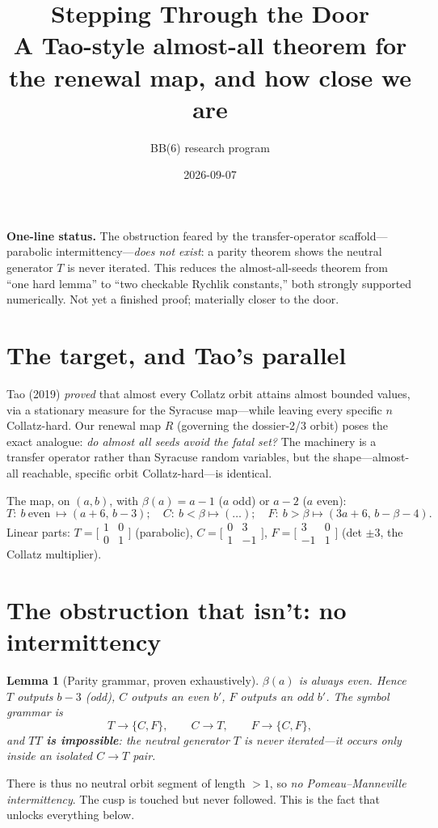 \documentclass[11pt]{article}
\title{\bfseries\color{ink} Stepping Through the Door\\[2pt]\large A Tao-style almost-all theorem for the renewal map, and how close we are}
\author{BB(6) research program}\date{2026-09-07}
\newtheorem{lemma}{Lemma}\newtheorem{theorem}{Theorem}
\begin{document}
\maketitle

\noindent\textbf{One-line status.} The obstruction feared by the transfer-operator scaffold---parabolic intermittency---\emph{does not exist}: a parity theorem shows the neutral generator $T$ is never iterated. This reduces the almost-all-seeds theorem from ``one hard lemma'' to ``two checkable Rychlik constants,'' both strongly supported numerically. Not yet a finished proof; materially closer to the door.

\section{The target, and Tao's parallel}
Tao (2019) \emph{proved} that almost every Collatz orbit attains almost bounded values, via a stationary measure for the Syracuse map---while leaving every specific $n$ Collatz-hard. Our renewal map $R$ (governing the dossier-2/3 orbit) poses the exact analogue: \emph{do almost all seeds avoid the fatal set?} The machinery is a transfer operator rather than Syracuse random variables, but the shape---almost-all reachable, specific orbit Collatz-hard---is identical.

\smallskip\noindent The map, on $(a,b)$, with $\beta(a)=a-1$ ($a$ odd) or $a-2$ ($a$ even):
\[ T:\ b\ \text{even}\ \mapsto (a{+}6,\,b{-}3);\quad C:\ b<\beta \mapsto(\ldots);\quad F:\ b>\beta \mapsto(3a{+}6,\,b{-}\beta{-}4). \]
Linear parts: $T=\bigl[\begin{smallmatrix}1&0\\0&1\end{smallmatrix}\bigr]$ (parabolic), $C=\bigl[\begin{smallmatrix}0&3\\1&-1\end{smallmatrix}\bigr]$, $F=\bigl[\begin{smallmatrix}3&0\\-1&1\end{smallmatrix}\bigr]$ (det $\pm3$, the Collatz multiplier).

\section{The obstruction that isn't: no intermittency}
\begin{lemma}[Parity grammar, proven exhaustively]
$\beta(a)$ is always even. Hence $T$ outputs $b{-}3$ (odd), $C$ outputs an even $b'$, $F$ outputs an odd $b'$. The symbol grammar is
\[ T\to\{C,F\},\qquad C\to T,\qquad F\to\{C,F\}, \]
and \textbf{$TT$ is impossible}: the neutral generator $T$ is never iterated---it occurs only inside an isolated $C\!\to\!T$ pair.
\end{lemma}
There is thus no neutral orbit segment of length $>1$, so \emph{no Pomeau--Manneville intermittency}. The cusp is touched but never followed. This is the fact that unlocks everything below.
\end{document}
